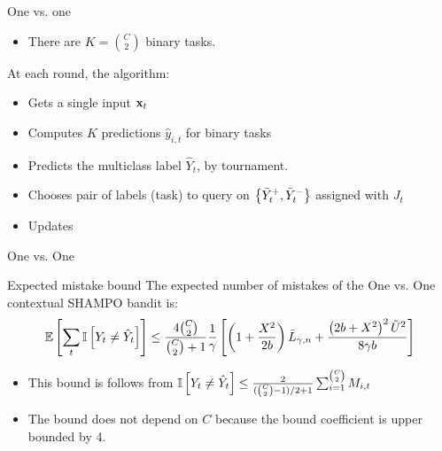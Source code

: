\documentclass{beamer}
\begin{document}
\begin{frame}{One vs. one}
\begin{itemize}

\item There are $K= {C\choose2}$ binary tasks.\newline

\end{itemize}
At each round, the algorithm:\newline
\begin{itemize}
\item Gets a single input $\mathbf{x}_{t}$\newline
\item Computes $K$ predictions  $\hat{y}_{i,t}$ for binary tasks\newline
\item Predicts the multiclass label $\hat{Y}_t$, by tournament. \newline
\item Chooses pair of labels  (task) to  query on $\left\{{\bar{Y}_t^{+},\bar{Y}_t^{-}}\right\}$ assigned with $J_t$ \newline
\item Updates%
\end{itemize}
\end{frame}

\begin{frame}{One vs. One}
\begin{block}{Expected mistake bound}
The  expected number of mistakes  of the One vs. One contextual SHAMPO bandit  is:
\begin{displaymath}
\begin{split}
\mathbb{E}\left[{\sum_t \mathbb{I}\left[{Y_t \neq \hat{Y}_t}\right]}\right]\le
\frac{4{C \choose 2}}{{C \choose 2}+1} \frac{1}{\gamma}\left[{\left({1+\frac{X^2}{2b} }\right){\bar L}_{\gamma,n}+\frac{\left({{2b+X^2}}\right)^2\tilde{U}^{2}}{8{\gamma}b}}\right]
\end{split}
\end{displaymath}
\end{block}
\begin{itemize}

\item This bound is follows from $\mathbb{I}\left[{Y_t \neq \hat{Y}_t}\right] \leq \frac{2}{({C \choose 2}-1)/2+1}\sum_{i=1}^{ {C \choose 2}} M_{i,t}$\newline [Allwein et al., 2000]\newline
\item The bound does not depend on $C$ because the bound coefficient is upper bounded by 4.
\end{itemize}
\end{frame}
\end{document}
